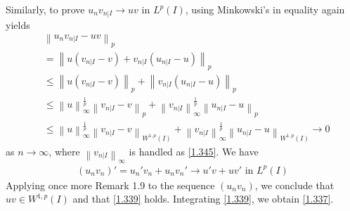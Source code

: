 \documentclass[a4paper,oneside]{article}
\numberwithin{equation}{section}
\begin{document}
Similarly, to prove ${u_n}{v_{\left. n \right|I}} \to uv$ in $L^p\left(I\right)$, using Minkowski's in equality again yields
\begin{align}
&{\left\| {{u_n}{v_{\left. n \right|I}} - uv} \right\|_p} \\
&= {\left\| {u\left( {{v_{\left. n \right|I}} - v} \right) + {v_{\left. n \right|I}}\left( {{u_{\left. n \right|I}} - u} \right)} \right\|_p}\\
& \le {\left\| {u\left( {{v_{\left. n \right|I}} - v} \right)} \right\|_p} + {\left\| {{v_{\left. n \right|I}}\left( {{u_{\left. n \right|I}} - u} \right)} \right\|_p}\\
& \le \left\| u \right\|_\infty ^{\frac{1}{p}}{\left\| {{v_{\left. n \right|I}} - v} \right\|_p} + \left\| {{v_{\left. n \right|I}}} \right\|_\infty ^{\frac{1}{p}}{\left\| {{u_{\left. n \right|I}} - u} \right\|_p}\\
& \le \left\| u \right\|_\infty ^{\frac{1}{p}}{\left\| {{v_{\left. n \right|I}} - v} \right\|_{{W^{1,p}}\left( I \right)}} + \left\| {{v_{\left. n \right|I}}} \right\|_\infty ^{\frac{1}{p}}{\left\| {{u_{\left. n \right|I}} - u} \right\|_{{W^{1,p}}\left( I \right)}} \to 0
\end{align}
as $n \to \infty$, where ${\left\| {{v_{\left. n \right|I}}} \right\|_\infty }$ is handled as \eqref{1.345}. We have
\begin{align}
\left( {{u_n}{v_n}} \right)' = {u_n}'{v_n} + {u_n}{v_n}' \to u'v + uv'\mbox{ in } {L^p}\left( I \right)
\end{align}
Applying once more Remark 1.9 to the sequence $\left(u_nv_n\right)$, we conclude that $uv\in W^{1,p}\left(I\right)$ and that \eqref{1.339} holds. Integrating \eqref{1.339}, we obtain \eqref{1.337}.
\end{document}
